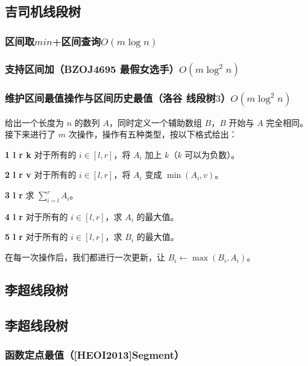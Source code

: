 \documentclass[landscape,twoside,a4paper]{article}
\begin{document}
\subsection{吉司机线段树}

\subsubsection{区间取$min$+区间查询$O(m \log n)$}


\subsubsection{支持区间加（BZOJ4695 最假女选手）$O(m \log ^{2}n)$}


\subsubsection{维护区间最值操作与区间历史最值（洛谷 线段树$3$）$O(m \log ^{2}n)$}
给出一个长度为 $n$ 的数列 $A$，同时定义一个辅助数组 $B$，$B$ 开始与 $A$ 完全相同。接下来进行了 $m$ 次操作，操作有五种类型，按以下格式给出：\par
\textbf{1 l r k} 对于所有的 $i\in[l,r]$，将 $A_i$ 加上 $k$（$k$ 可以为负数）。\par
\textbf{2 l r v} 对于所有的 $i\in[l,r]$，将 $A_i$ 变成 $\min(A_i,v)$。\par
\textbf{3 l r} 求 $\sum_{i=l}^{r}A_i$。\par
\textbf{4 l r} 对于所有的 $i\in[l,r]$，求 $A_i$ 的最大值。\par
\textbf{5 l r} 对于所有的 $i\in[l,r]$，求 $B_i$ 的最大值。\par
在每一次操作后，我们都进行一次更新，让 $B_i\gets\max(B_i,A_i)$。\par


\subsection{李超线段树}

\subsection{李超线段树}
\subsubsection{函数定点最值（[HEOI2013]Segment）}

\end{document}
